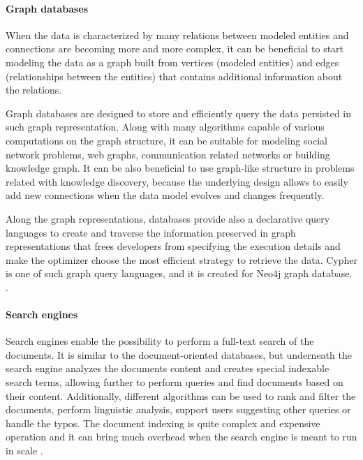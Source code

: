 \paragraph{Graph databases}

When the data is characterized by many relations between modeled entities and connections are becoming more and more complex, it can be beneficial to start modeling the data as a graph built from vertices (modeled entities) and edges (relationships between the entities) that contains additional information about the relations. 

Graph databases are designed to store and efficiently query the data persisted in such graph representation. Along with many algorithms capable of various computations on the graph structure, it can be suitable for modeling social network problems, web graphs, communication related networks or building knowledge graph. It can be also beneficial to use graph-like structure in problems related with knowledge discovery, because the underlying design allows to easily add new connections when the data model evolves and changes frequently.

Along the graph representations, databases provide also a declarative query languages to create and traverse the information preserved in graph representations that frees developers from specifying the execution details and make the optimizer choose the most efficient strategy to retrieve the data. Cypher is one of such graph query languages, and it is created for Neo4j \cite{Neo4j} graph database. \cite{DesignDataIntensiveApplications}.

\paragraph{Search engines}

Search engines enable the possibility to perform a full-text search of the documents. It is similar to the document-oriented databases, but underneath the search engine analyzes the documents content and creates special indexable search terms, allowing further to perform queries and find documents based on their content. Additionally, different algorithms can be used to rank and filter the documents, perform linguistic analysis, support users suggesting other queries or handle the typos. The document indexing is quite complex and expensive operation and it can bring much overhead when the search engine is meant to run in scale \cite{DesignDataIntensiveApplications}. 

